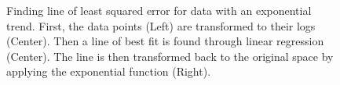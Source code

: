 \begin{figure}[!h]
\begin{subfigure}{0.32\textwidth}
    \end{subfigure}
  \caption{Finding line of least squared error for data with an exponential trend. First, the data points (Left) are transformed to their logs (Center). Then a line of best fit is found through linear regression (Center). The line is then transformed back to the original space by applying the exponential function (Right).}
  \label{fig:log_regression}
\end{figure}


